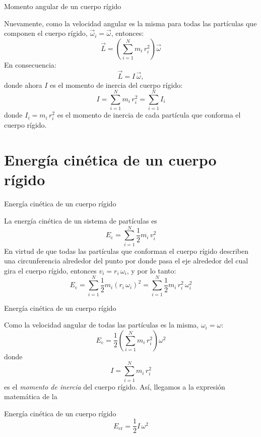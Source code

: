 \documentclass[11pt,handout,aspectratio=1610]{beamer}
\begin{document}
\begin{frame}{Momento angular de un cuerpo rígido}

    Nuevamente, como la velocidad angular es la misma para todas las partículas que componen el cuerpo rígido, $\vec{\omega}_i = \vec{\omega}$, entonces: $$ \vec{L} = \left(\sum_{i=1}^N m_i \, r_i^2\right) \vec{\omega} $$ En consecuencia:
    \begin{equation*}
        \boxed{\vec{L} =  I \, \vec{\omega},}
    \end{equation*} donde ahora $I$ es el momento de inercia del cuerpo rígido: $$ I = \sum_{i=1}^N m_i \, r_i^2 = \sum_{i=1}^N I_i $$ donde $I_i = m_i \, r_i^2$ es el momento de inercia de cada partícula que conforma el cuerpo rígido.
    
\end{frame}

\section{Energía cinética de un cuerpo rígido}

\begin{frame}{Energía cinética de un cuerpo rígido}

La energía cinética de un sistema de partículas es $$E_\text{c} = \sum_{i=1}^N \frac{1}{2} m_i \, v_i^2$$ \pause En virtud de que todas las partículas que conforman el cuerpo rígido describen una circunferencia alrededor del punto por donde pasa el eje alrededor del cual gira el cuerpo rígido, entonces $v_i = r_i \, \omega_i$, y por lo tanto: $$E_\text{c} = \sum_{i=1}^N \frac{1}{2} m_i \left(r_i \, \omega_i\right)^2 = \sum_{i=1}^N \frac{1}{2} m_i \, r_i^2 \, \omega_i^2$$

\end{frame}

\begin{frame}{Energía cinética de un cuerpo rígido}

Como la velocidad angular de todas las partículas es la misma, $\omega_i = \omega$: $$E_\text{c} = \frac{1}{2} \left(\sum_{i=1}^N m_i \, r_i^2\right) \omega^2$$ donde $$ I = \sum_{i=1}^N m_i \, r_i^2$$ es el \emph{momento de inercia} del cuerpo rígido. Así, llegamos a la expresión matemática de la
    
\begin{block}{Energía cinética de un cuerpo rígido}
    $$E_\text{cr} = \frac{1}{2} I \, \omega^2$$
\end{block} 

\end{frame}
\end{document}
